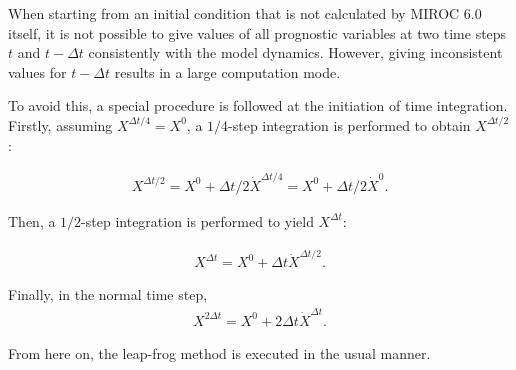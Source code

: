 When starting from an initial condition that is not calculated by MIROC 6.0 itself, it is not possible to give values of all prognostic variables at two time steps \(t\) and \(t-\Delta t\)
consistently with the model dynamics. However, giving inconsistent values for \(t-\Delta t\) results in a large computation mode.

To avoid this, a special procedure is followed at the initiation of time integration. Firstly, assuming \(X^{\Delta t/4} = X^0\), a \(1/4\)-step integration is performed to obtain \(X^{\Delta t/2}\):

\begin{eqnarray}
X^{\Delta t/2} = X^0 + \Delta t/2 \dot{X}^{\Delta t/4}
= X^0 + \Delta t/2 \dot{X}^0.
\end{eqnarray}

Then, a \(1/2\)-step integration is performed to yield \(X^{\Delta t}\):

\begin{eqnarray}
X^{\Delta t}   = X^0 + \Delta t \dot{X}^{\Delta t/2}.
\end{eqnarray}

Finally, in the normal time step, \begin{eqnarray}
X^{2\Delta t}   = X^0 + 2 \Delta t \dot{X}^{\Delta t}.
\end{eqnarray}

From here on, the leap-frog method is executed in the usual manner.
